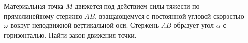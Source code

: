 Материальная точка $M$ движется под действием силы тяжести по прямолинейному стержню $AB$,
вращающемуся с постоянной угловой скоростью $\omega$ вокруг неподвижной вертикальной оси.
Стержень $AB$ образует угол $\alpha$ с горизонталью.
Найти закон движения точки.
